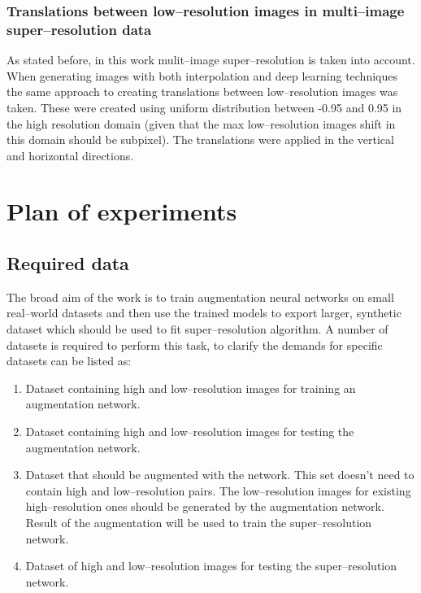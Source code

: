 \subsubsection{Translations between low--resolution images in multi--image super--resolution data}
As stated before, in this work mulit--image super--resolution is taken into account.
When generating images with both interpolation and deep learning techniques the same approach to creating translations between low--resolution images was taken.
These were created using uniform distribution between -0.95 and 0.95 in the high resolution domain (given that the max low--resolution images shift in this domain should be subpixel).
The translations were applied in the vertical and horizontal directions.

\section{Plan of experiments}
\subsection{Required data}
The broad aim of the work is to train augmentation neural networks on small real--world datasets and then use the trained models to export larger, synthetic dataset which should be used to fit super--resolution algorithm.
A number of datasets is required to perform this task, to clarify the demands for specific datasets can be listed as:
\begin{enumerate}
	\item Dataset containing high and low--resolution images for training an augmentation network.
	\item Dataset containing high and low--resolution images for testing the augmentation network.
	\item Dataset that should be augmented with the network.
	      This set doesn't need to contain high and low--resolution pairs.
	      The low--resolution images for existing high--resolution ones should be generated by the augmentation network.
	      Result of the augmentation will be used to train the super--resolution network.
	 \item Dataset of high and low--resolution images for testing the super--resolution network.
\end{enumerate}

